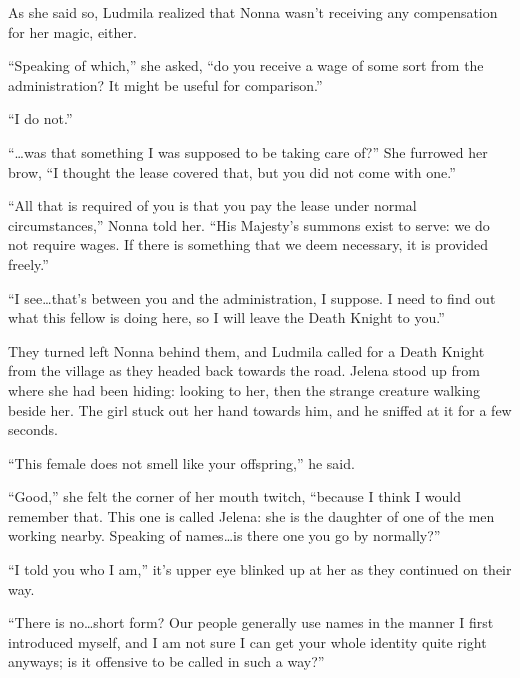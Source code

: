  

As she said so, Ludmila realized that Nonna wasn’t receiving any compensation for her magic, either.

 

“Speaking of which,” she asked, “do you receive a wage of some sort from the administration? It might be useful for comparison.”

 

“I do not.”

 

“…was that something I was supposed to be taking care of?” She furrowed her brow, “I thought the lease covered that, but you did not come with one.”

 

“All that is required of you is that you pay the lease under normal circumstances,” Nonna told her. “His Majesty’s summons exist to serve: we do not require wages. If there is something that we deem necessary, it is provided freely.”

 

“I see…that’s between you and the administration, I suppose. I need to find out what this fellow is doing here, so I will leave the Death Knight to you.”

 

They turned left Nonna behind them, and Ludmila called for a Death Knight from the village as they headed back towards the road. Jelena stood up from where she had been hiding: looking to her, then the strange creature walking beside her. The girl stuck out her hand towards him, and he sniffed at it for a few seconds.

 

“This female does not smell like your offspring,” he said.

 

“Good,” she felt the corner of her mouth twitch, “because I think I would remember that. This one is called Jelena: she is the daughter of one of the men working nearby. Speaking of names…is there one you go by normally?”

 

“I told you who I am,” it’s upper eye blinked up at her as they continued on their way.

 

“There is no…short form? Our people generally use names in the manner I first introduced myself, and I am not sure I can get your whole identity quite right anyways; is it offensive to be called in such a way?”

